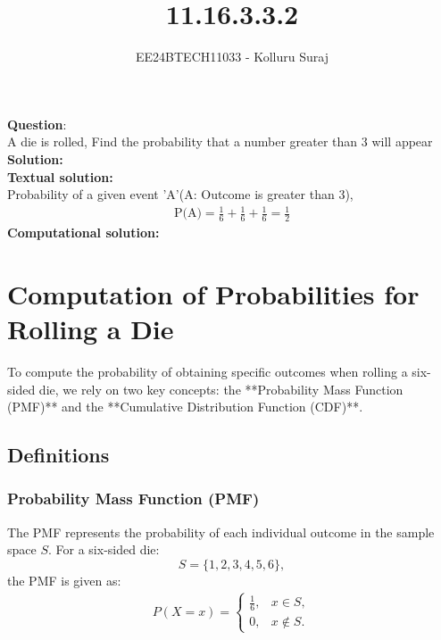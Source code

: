 \documentclass[journal]{IEEEtran}
\begin{document}
	
	
	\vspace{3cm}
	
	\title{11.16.3.3.2}
	\author{EE24BTECH11033 - Kolluru Suraj }
	{\let\newpage\relax\maketitle}
	
	\renewcommand{\thefigure}{\theenumi}
	\renewcommand{\thetable}{\theenumi}
	\setlength{\intextsep}{10pt} %
	
	
	\renewcommand{\thetable}{\theenumi}
	
	
\textbf{Question}:\\
A die is rolled, Find the probability that a number greater than 3 will appear \\
\textbf{Solution: }\\
\textbf{Textual solution: }\\
Probability of a given event 'A'(A: Outcome is greater than 3),\\
\begin{align}
    \text{P(A)}=\frac{1}{6}+\frac{1}{6}+\frac{1}{6}=\frac{1}{2}
\end{align}
\textbf{Computational solution: }\\



\section*{Computation of Probabilities for Rolling a Die}

To compute the probability of obtaining specific outcomes when rolling a six-sided die, we rely on two key concepts: the **Probability Mass Function (PMF)** and the **Cumulative Distribution Function (CDF)**.

\subsection*{Definitions}
\subsubsection*{Probability Mass Function (PMF)}
The PMF represents the probability of each individual outcome in the sample space \( S \). For a six-sided die:
\[
S = \{1, 2, 3, 4, 5, 6\},
\]
the PMF is given as:
\begin{align}
P(X = x) = 
\begin{cases} 
\frac{1}{6}, & x \in S, \\ 
0, & x \notin S.
\end{cases}
\end{align}
\end{document}
